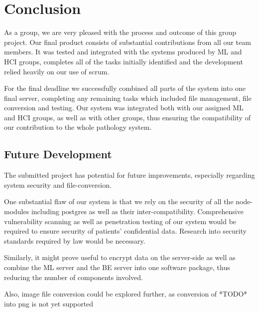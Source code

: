 \section{Conclusion}
As a group, we are very pleased with the process and outcome of this group project. Our final product consists of substantial contributions from all our team members. It was tested and integrated with the systems produced by ML and HCI groups, completes all of the tasks initially identified and the development relied heavily on our use of scrum. 

For the final deadline we successfully combined all parts of the system into one final server, completing any remaining tasks which included file management, file conversion and testing. Our system was integrated both with our assigned ML and HCI groups, as well as with other groups, thus ensuring the compatibility of our contribution to the whole pathology system. 

\subsection{Future Development}
The submitted project has potential for future improvements, especially regarding system security and file-conversion. 

One substantial flaw of our system is that we rely on the security of all the node-modules including postgres as well as their inter-compatibility. Comprehensive vulnerability scanning as well as penetration testing of our system would be required to ensure security of patients' confidential data. Research into security standards required by law would be necessary.

Similarly, it might prove useful to encrypt data on the server-side as well as combine the ML server and the BE server into one software package, thus reducing the number of components involved.

Also, image file conversion could be explored further, as conversion of *TODO* into png is not yet supported

